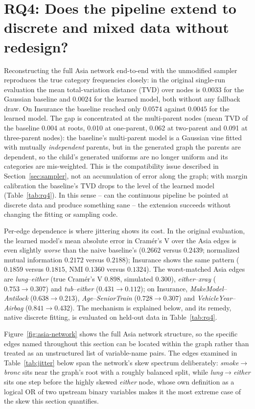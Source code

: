 \documentclass[
  english,
  class=report,
  accentcolor=2c,
  marginpar=false,
  parskip=half-,
  fontsize=11pt,
  ruledheaders=false,
  pdfa=false,
  IMRAD=false,
  thesis={type=master}
]{tudapub}
\begin{document}
\section{RQ4: Does the pipeline extend to discrete and mixed data without redesign?}
\label{sec:rq4}
\label{sec:discrete-results}
Reconstructing the full Asia network end-to-end with the unmodified sampler
reproduces the true category frequencies closely: in the original
single-run evaluation the mean total-variation distance (TVD) over nodes is
$0.0033$ for the Gaussian baseline and $0.0024$ for the learned model, both
without any fallback draw. On Insurance the baseline reached only $0.0574$
against $0.0045$ for the learned model. The gap is concentrated at the
multi-parent nodes (mean TVD of the baseline 0.004 at roots, 0.010 at
one-parent, 0.062 at two-parent and 0.091 at three-parent nodes): the
baseline's multi-parent model is a Gaussian vine fitted with mutually
\emph{independent} parents, but in the generated graph the parents are
dependent, so the child's generated uniforms are no longer uniform and its
categories are mis-weighted. This is the compatibility issue described in
Section~\ref{sec:sampler}, not an accumulation of error along the graph;
with margin calibration the baseline's TVD drops to the level of the
learned model (Table~\ref{tab:rq4}). In this sense -- can the continuous
pipeline be pointed at discrete data and produce something sane -- the
extension succeeds without changing the fitting or sampling code.

Per-edge dependence is where jittering shows its cost. In the original
evaluation, the learned model's mean absolute error in Cram\'er's V over the
Asia edges is even slightly \emph{worse} than the naive baseline's ($0.2662$
versus $0.2439$; normalized mutual information $0.2172$ versus $0.2188$);
Insurance shows the same pattern ($0.1859$ versus $0.1815$, NMI $0.1360$
versus $0.1324$). The worst-matched Asia edges are \emph{lung}--\emph{either}
(true Cram\'er's V $0.898$, simulated $0.300$), \emph{either}--\emph{xray}
($0.753 \to 0.307$) and \emph{tub}--\emph{either} ($0.431 \to 0.112$); on
Insurance, \emph{MakeModel}--\emph{Antilock} ($0.638 \to 0.213$),
\emph{Age}--\emph{SeniorTrain} ($0.728 \to 0.307$) and
\emph{VehicleYear}--\emph{Airbag} ($0.841 \to 0.432$). The mechanism is
explained below, and its remedy, native discrete fitting, is evaluated on
held-out data in Table~\ref{tab:rq4}.

Figure~\ref{fig:asia-network} shows the full Asia network structure, so
the specific edges named throughout this section can be located within the
graph rather than treated as an unstructured list of variable-name pairs.
The edges examined in Table~\ref{tab:jitter} below span the network's
skew spectrum deliberately: \emph{smoke}$\to$\emph{bronc} sits near the
graph's root with a roughly balanced split, while \emph{lung}$\to$\emph{either}
sits one step before the highly skewed \emph{either} node, whose own
definition as a logical OR of two upstream binary variables makes it the
most extreme case of the skew this section quantifies.
\end{document}
